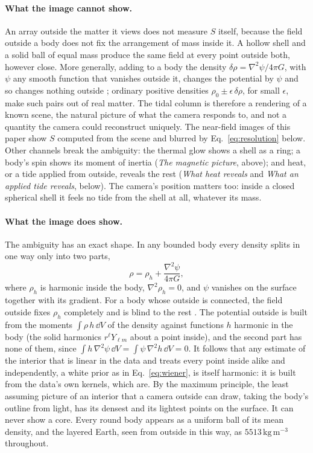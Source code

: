 \paragraph{What the image cannot show.} An array outside the matter it views
does not measure $S$ itself, because the field outside a body does not fix the
arrangement of mass inside it. A hollow shell and a solid ball of equal mass
produce the same field at every point outside both, however close. More
generally, adding to a body the density $\delta\rho = \nabla^2\psi/4\pi G$,
with $\psi$ any smooth function that vanishes outside it, changes the
potential by $\psi$ and so changes nothing outside \cite{YurtseverMarzbanMeila2011};
ordinary positive densities $\rho_0 \pm \epsilon\,\delta\rho$, for small $\epsilon$, make such pairs
out of real matter. The tidal column is therefore a rendering of a known
scene, the natural picture of what the camera responds to, and not a quantity
the camera could reconstruct uniquely. The near-field images of this paper show $S$
computed from the scene and blurred by Eq.~\eqref{eq:resolution} below. Other channels break
the ambiguity: the thermal glow shows a shell as a ring; a body's spin shows its moment of
inertia (\emph{The magnetic picture}, above); and heat, or a tide applied from
outside, reveals the rest (\emph{What heat reveals} and \emph{What an applied tide reveals}, below). The camera's position matters too: inside a closed
spherical shell it feels no tide from the shell at all, whatever its mass.

\paragraph{What the image does show.} The ambiguity has an exact shape. In any
bounded body every density splits in one way only into two
parts,
\begin{equation}\label{eq:split}
\rho = \rho_h + \frac{\nabla^2\psi}{4\pi G} ,
\end{equation}
where $\rho_h$ is harmonic inside the body, $\nabla^2\rho_h = 0$, and $\psi$
vanishes on the surface together with its gradient. For a body whose outside is connected, the field outside fixes
$\rho_h$ completely and is blind to the rest \cite{Isakov1990}. The potential
outside is built from the moments $\int\rho\,h\,\dd V$ of the density against
functions $h$ harmonic in the body (the solid harmonics $r^\ell Y_{\ell m}$
about a point inside), and the second part has none of them, since
$\int h\,\nabla^2\psi\,\dd V = \int \psi\,\nabla^2 h\,\dd V = 0$. It follows that
any estimate of the interior that is linear in the data and treats every point
inside alike and independently, a white prior as in Eq.~\eqref{eq:wiener}, is
itself harmonic: it is built from the data's own kernels, which are. By the
maximum principle, the least assuming picture of an interior that a camera
outside can draw, taking the body's outline from light, has its densest and
its lightest points on the surface. It can never show a core. Every round body appears as a
uniform ball of its mean density, and the layered Earth, seen from outside in
this way, as $5513\,\mathrm{kg\,m^{-3}}$ throughout.

